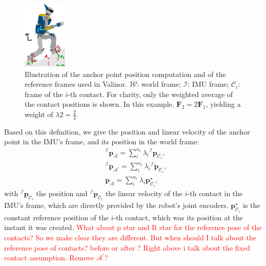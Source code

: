 \documentclass{IJCAS}
\begin{document}
\begin{figure}[!t]
\begin{center}
\includegraphics[width=0.5\columnwidth]{Uploaded/Images/framesAndAnchor.pdf} 
\vskip -0.5pc
\caption{Illustration of the anchor point position computation and of the reference frames used in Valinor. $\mathcal{W}$: world frame; $\mathcal{I}$: IMU frame; $\mathcal{C}_{i}$: frame of the $i$-th contact. For clarity, only the weighted average of the contact positions is shown. In this example, $\boldsymbol{F}_{2} = 2\boldsymbol{F}_{1}$, yielding a weight of $\lambda{2} = \frac{2}{3}$.}\label{fig:framesAndAnchor}
\end{center}
\vskip -1.5pc
\end{figure}

Based on this definition, we give the position and linear velocity of the anchor point in the IMU's frame, and its position in the world frame:
\begin{align} 
&{^{\mathcal{I}}}\boldsymbol{p}_{\mathcal{A}} = \sum^{n_{c}}_{i} \lambda_{i}  {^{\mathcal{I}}} \boldsymbol{p}_{{\mathcal{C}}_{i}}, \label{eq:imuAnchorPos} \\
&{^{\mathcal{I}}} \dot{\boldsymbol{p}}_{\mathcal{A}^{\prime}} = \sum^{n_{c}}_{i} \lambda_{i}  {^{\mathcal{I}}} \dot{\boldsymbol{p}}_{{\mathcal{C}}_{i}}, \label{eq:imuAnchorVel} \\
&\boldsymbol{p}_{\mathcal{A}} = \sum^{n_{c}}_{i} \lambda_{i} \boldsymbol{p}^{\star}_{{\mathcal{C}}_{i}}, \label{eq:anchorPointPos}
\end{align} 
with ${^{\mathcal{I}}} \boldsymbol{p}_{{\mathcal{C}}_{i}}$ the position and ${^{\mathcal{I}}} \dot{\boldsymbol{p}}_{{\mathcal{C}}_{i}}$ the linear velocity of the $i$-th contact in the IMU's frame, which are directly provided by the robot's joint encoders. $\boldsymbol{p}^{\star}_{{\mathcal{C}}_{i}}$ is the constant reference position of the $i$-th contact, which was its position at the instant it was created.
\textcolor{red}{What about p star and R star for the reference pose of the contacts? So we make clear they are different. But when should I talk about the reference pose of contacts? before or after ? Right above i talk about the fixed contact assumption.}
\textcolor{red}{Remove $\mathcal{A}^\prime$?}
\end{document}
